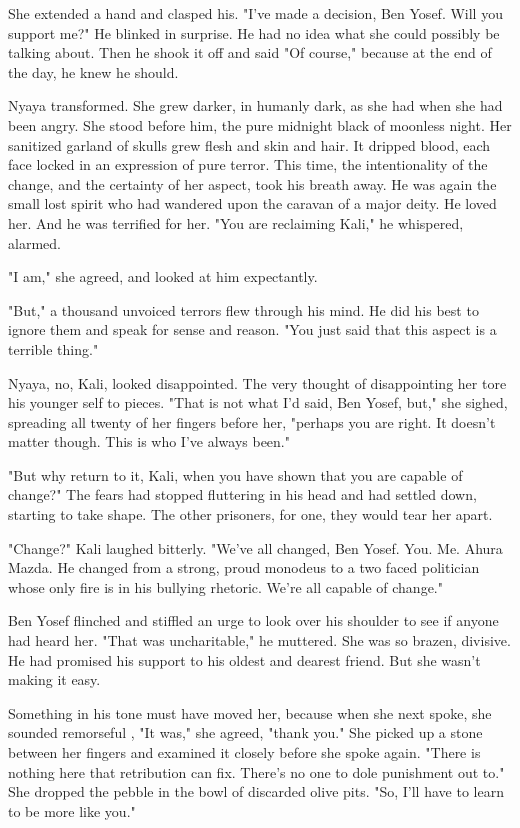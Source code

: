 \documentclass{amsart}
\begin{document}
She extended a hand and clasped his. "I've made a decision, Ben Yosef. Will you support me?" He blinked in surprise. He had no idea what she could possibly be talking about. Then he shook it off and said "Of course," because at the end of the day, he knew he should.

Nyaya transformed. She grew darker, in humanly dark, as she had when she had been angry. She stood before him, the pure midnight black of moonless night. Her sanitized garland of skulls grew flesh and skin and hair. It dripped blood, each face locked in an expression of pure terror. This time, the intentionality of the change, and the certainty of her aspect, took his breath away. He was again the small lost spirit who had wandered upon the caravan of a major deity. He loved her. And he was terrified for her.  "You are reclaiming Kali," he whispered, alarmed.

"I am," she agreed, and looked at him expectantly. 

"But," a thousand unvoiced terrors flew through his mind. He did his best to ignore them and speak for sense and reason. "You just said that this aspect is a terrible thing."

Nyaya, no, Kali, looked disappointed. The very thought of disappointing her tore his younger self to pieces. "That is not what I'd said, Ben Yosef, but," she sighed, spreading all twenty of her fingers before her, "perhaps you are right. It doesn't matter though. This is who I've always been." 

"But why return to it, Kali, when you have shown that you are capable of change?" The fears had stopped fluttering in his head and had settled down, starting to take shape. The other prisoners, for one, they would tear her apart.

"Change?" Kali laughed bitterly. "We've all changed, Ben Yosef. You. Me. Ahura Mazda. He changed from a strong, proud monodeus to a two faced politician whose only fire is in his bullying rhetoric. We're all capable of change."

Ben Yosef flinched and stiffled an urge to look over his shoulder to see if anyone had heard her. "That was uncharitable," he muttered. She was so brazen, divisive. He had promised his support to his oldest and dearest friend. But she wasn't making it easy. 

Something in his tone must have moved her, because when she next spoke, she sounded remorseful , "It was," she agreed, "thank you." She picked up a stone between her fingers and examined it closely before she spoke again. "There is nothing here that retribution can fix. There's no one to dole punishment out to."  She dropped the pebble in the bowl of discarded olive pits. "So, I'll have to learn to be more like you." 
\end{document}
